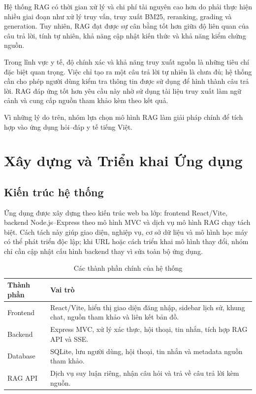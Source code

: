 \documentclass[12pt,a4paper,oneside]{report}
\begin{document}
Hệ thống RAG có thời gian xử lý và chi phí tài nguyên cao hơn do phải thực hiện nhiều giai đoạn như xử lý truy vấn, truy xuất BM25, reranking, grading và generation. Tuy nhiên, RAG đạt được sự cân bằng tốt hơn giữa độ liên quan của câu trả lời, tính tự nhiên, khả năng cập nhật kiến thức và khả năng kiểm chứng nguồn.

Trong lĩnh vực y tế, độ chính xác và khả năng truy xuất nguồn là những tiêu chí đặc biệt quan trọng. Việc chỉ tạo ra một câu trả lời tự nhiên là chưa đủ; hệ thống cần cho phép người dùng kiểm tra thông tin được sử dụng để hình thành câu trả lời. RAG đáp ứng tốt hơn yêu cầu này nhờ sử dụng tài liệu truy xuất làm ngữ cảnh và cung cấp nguồn tham khảo kèm theo kết quả.

Vì những lý do trên, nhóm lựa chọn mô hình RAG làm giải pháp chính để tích hợp vào ứng dụng hỏi--đáp y tế tiếng Việt.

\chapter{Xây dựng và Triển khai Ứng dụng}
\label{chap:deployment}

\section{Kiến trúc hệ thống}
Ứng dụng được xây dựng theo kiến trúc web ba lớp: frontend React/Vite, backend Node.js--Express theo mô hình MVC và dịch vụ mô hình RAG chạy tách biệt. Cách tách này giúp giao diện, nghiệp vụ, cơ sở dữ liệu và mô hình học máy có thể phát triển độc lập; khi URL hoặc cách triển khai mô hình thay đổi, nhóm chỉ cần cập nhật cấu hình backend thay vì sửa toàn bộ ứng dụng.

\begin{table}[H]
\centering
\caption{Các thành phần chính của hệ thống}
\label{tab:deployment-components}
\begin{tabularx}{\textwidth}{p{3.4cm}Y}
\toprule
\textbf{Thành phần} & \textbf{Vai trò}\\
\midrule
Frontend & React/Vite, hiển thị giao diện đăng nhập, sidebar lịch sử, khung chat, nguồn tham khảo và liên kết bản đồ.\\
Backend & Express MVC, xử lý xác thực, hội thoại, tin nhắn, tích hợp RAG API và SSE.\\
Database & SQLite, lưu người dùng, hội thoại, tin nhắn và metadata nguồn tham khảo.\\
RAG API & Dịch vụ suy luận riêng, nhận câu hỏi và trả về câu trả lời kèm nguồn.\\
\bottomrule
\end{tabularx}
\end{table}
\end{document}
